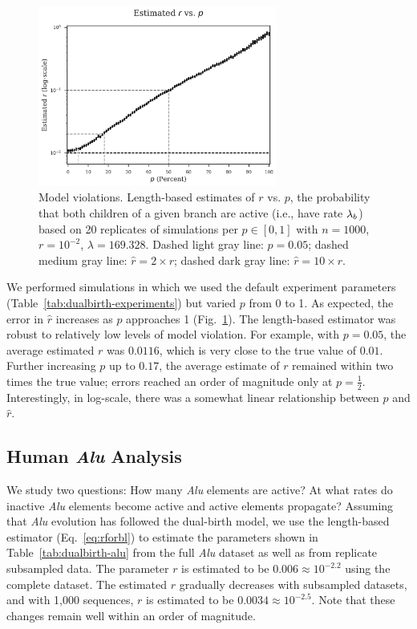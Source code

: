 \begin{figure} %
\centering
\includegraphics[width=0.7\textwidth]{figs/dualbirth-model-violations}
\caption[Model Violations]
{Model violations. Length-based estimates of $r$ vs. $p$, the probability that both children of a given branch are active (i.e., have rate $\lambda_b$) based on 20 replicates of simulations per $p\in[0,1]$ with $n=1000$, $r=10^{-2}$, $\lambda=169.328$. Dashed light gray line: $p=0.05$; dashed medium gray line: $\hat{r}=2\times r$; dashed dark gray line: $\hat{r}=10\times r$.}
\label{fig:dualbirth-model-violations}
\end{figure}

We performed simulations in which we used the default experiment parameters (Table~\ref{tab:dualbirth-experiments}) but varied $p$ from 0 to 1. As expected, the error in $\hat{r}$ increases as $p$ approaches 1 (Fig.~\ref{fig:dualbirth-model-violations}). The length-based estimator was  robust to relatively low levels of model violation. For example, with $p=0.05$, the average estimated $r$ was $0.0116$, which is very close to the true value of $0.01$. Further increasing $p$ up to $0.17$, the average estimate of $r$ remained within two times the true value; errors reached an order of magnitude only at $p=\frac{1}{2}$. Interestingly, in log-scale, there was a somewhat linear relationship between $p$ and $\hat{r}$.

\subsection{Human \textit{Alu} Analysis}\label{sec:dualbirth-human-alu-analyses}
We study two questions: How many \textit{Alu} elements are active? At what rates do inactive \textit{Alu} elements become active and active elements propagate? Assuming that \textit{Alu} evolution has followed the dual-birth model, we use the length-based estimator (Eq.~\ref{eq:rforbl}) to estimate the parameters shown in Table~\ref{tab:dualbirth-alu} from the full \textit{Alu} dataset as well as from replicate subsampled data. The parameter $r$ is estimated to be $0.006\approx10^{-2.2}$ using the complete dataset. The estimated $r$ gradually decreases with subsampled datasets, and with 1,000 sequences, $r$ is estimated to be $0.0034\approx10^{-2.5}$. Note that these changes remain well within an order of magnitude.

